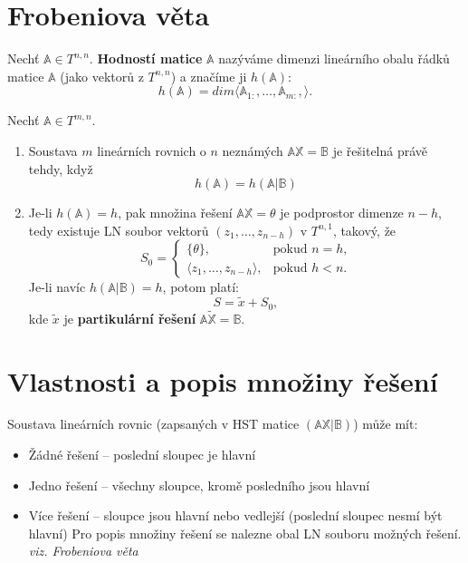 \documentclass{../szzclass}
\begin{document}
\section{Frobeniova věta}
\begin{definition}
Nechť $\mathbb{A}\in T^{n,n}$. \textbf{Hodností matice} $\mathbb{A}$ nazýváme dimenzi lineárního obalu řádků matice $\mathbb{A}$ (jako vektorů z $T^{n,n}$) a značíme ji $h(\mathbb{A})$:
\begin{equation}
  h(\mathbb{A})=dim\langle \mathbb{A}_{1:},\dots,\mathbb{A}_{m:},\rangle.
\end{equation}
\end{definition}

\begin{theorem}
Nechť $\mathbb{A}\in T^{m,n}$.
\begin{enumerate}
\item Soustava $m$ lineárních rovnich o $n$ neznámých $\mathbb{A} \mathbb{X}=\mathbb{B}$ je řešitelná právě tehdy, když
$$
h(\mathbb{A})=h(\mathbb{A} | \mathbb{B})
$$
\item Je-li $h(\mathbb{A})=h$, pak množina řešení $\mathbb{A} \mathbb{X}=\theta$ je podprostor dimenze $n-h$, tedy existuje LN soubor vektorů $(z_1,\dots,z_{n-h})$ v $T^{n,1}$, takový, že
$$ S_0=\begin{cases}
       \{\theta\}, & \text{pokud $n=h$,} \\
       \langle z_1,\dots,z_{n-h}\rangle, & \text{pokud $h<n$.}
       \end{cases}
$$
Je-li navíc $h(\mathbb{A}|\mathbb{B})=h$, potom platí:
$$
S=\widetilde{x} + S_0,
$$ kde $\widetilde{x}$ je \textbf{partikulární řešení} $\mathbb{A} \widetilde{\mathbb{X}}=\mathbb{B}$.
\end{enumerate}
\end{theorem}

\section{Vlastnosti a popis množiny řešení}
Soustava lineárních rovnic (zapsaných v HST matice $(\mathbb{A}\mathbb{X}|\mathbb{B})$) může mít:
\begin{itemize}
\item Žádné řešení -- poslední sloupec je hlavní
\item Jedno řešení -- všechny sloupce, kromě posledního jsou hlavní
\item Více řešení -- sloupce jsou hlavní nebo vedlejší (poslední sloupec nesmí být hlavní)
Pro popis množiny řešení se nalezne obal LN souboru možných řešení. \emph{viz. Frobeniova věta}
\end{itemize}
\end{document}
